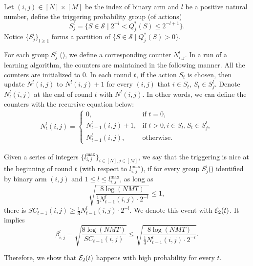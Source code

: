 \begin{definition}\label{def:TPgroup}
    Let $(i,j) \in [N] \times [M]$ be the index of binary arm and $l$ be a positive natural number, define the triggering probability group (of actions)
    \[
    S_j^l = \{S \in \mathcal{S} \mid 2^{-l} < Q_j^*(S) \leq 2^{-l+1}\}.
    \]
    Notice $\{S_j^l\}_{l \geq 1}$ forms a partition of $\{S \in \mathcal{S} \mid Q_j^*(S) > 0\}$.
\end{definition}
\begin{definition}\label{def:TPcounter}
    For each group $S_j^l$ (), we define a corresponding counter $N_{i,j}^l$. 
    In a run of a learning algorithm, the counters are maintained in the following manner. 
    All the counters are initialized to $0$. In each round $t$, if the action $S_t$ is chosen, then update $N^l(i,j)$ to $N^l(i,j) + 1$ for every $(i, j)$ that $i \in S_t$, $S_t \in S_j^l$. 
    Denote $N_t^l({i,j})$ at the end of round $t$ with $N^l(i,j)$. 
    In other words, we can define the counters with the recursive equation below:
    \begin{align*}
        N_t^l(i,j) =
        \begin{cases} 
            0, & \text{if } t = 0, \\
            N_{t-1}^l(i,j) + 1, & \text{if } t > 0, i\in S_t, S_t \in S_j^l, \\
            N_{t-1}^l(i,j), & \text{otherwise}.
        \end{cases}
    \end{align*}
\end{definition}
\begin{definition}\label{def:TPevent}
Given a series of integers $\{l_{i,j}^{\max}\}_{i \in [N],j\in[M]}$, we say that the triggering is nice at the beginning of round $t$ (with respect to $l_{i,j}^{\max}$), if for every group $S_j^l$() identified by binary arm $(i,j)$ and $1 \leq l \leq l_{i,j}^{\max}$, as long as 
\[
\sqrt{\frac{8 \log (NMT)}{\frac{1}{3} N_{t-1}^l(i,j)\cdot 2^{-l}}} \leq 1,
\]
there is $SC_{t-1}(i,j) \geq \frac{1}{3} N_{t-1}^l(i,j) \cdot 2^{-l}$. We denote this event with ${\mathcal{E}}_2(t)$. It implies
\[
\beta_{i,j}^t = \sqrt{\frac{8 \log(NMT)}{ SC_{t-1}(i,j)}} \leq \sqrt{\frac{8 \log(NMT)}{\frac{1}{3} N_{t-1}^l(i,j) \cdot 2^{-l}}}.
\]
\end{definition}
Therefore, we show that ${\mathcal{E}}_2(t)$ happens with high probability for every $t$. 
